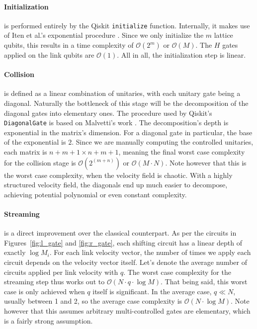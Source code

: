 \paragraph*{Initialization} is performed entirely by the Qiskit \texttt{initialize} function.
Internally, it makes use of Iten et al.'s exponential procedure \cite{iten2016isometries}.
Since we only initialize the $m$ lattice qubits, this results in a time complexity of $\mathcal{O}(2^m)$ or $\mathcal{O}(M)$.
The $H$ gates applied on the link qubits are $\mathcal{O}(1)$.
All in all, the initialization step is linear.

\paragraph*{Collision} is defined as a linear combination of unitaries, with each unitary gate being a diagonal.
Naturally the bottleneck of this stage will be the decomposition of the diagonal gates into elementary ones.
The procedure used by Qiskit's \texttt{DiagonalGate} is based on Malvetti's work \cite{malvetti2018synthesis}. The decomposition's depth is exponential in the matrix's dimension.
For a diagonal gate in particular, the base of the exponential is $2$.
Since we are manually computing the controlled unitaries, each matrix is $n+m+1 \times n+m+1$, meaning the final worst case complexity for the collision stage is $\mathcal{O}(2^{(m+n)})$ or $\mathcal{O}(M\cdot N)$.
Note however that this is the worst case complexity, when the velocity field is chaotic.
With a highly structured velocity field, the diagonals end up much easier to decompose, achieving potential polynomial or even constant complexity.

\paragraph*{Streaming} is a direct improvement over the classical counterpart.
As per the circuits in Figures~\ref{fig:l_gate} and \ref{fig:r_gate}, each shifting circuit has a linear depth of exactly $\log{M_i}$.
For each link velocity vector, the number of times we apply each circuit depends on the velocity vector itself.
Let's denote the average number of circuits applied per link velocity with $q$.
The worst case complexity for the streaming step thus works out to $\mathcal{O}(N\cdot q\cdot\log{M})$.
That being said, this worst case is only achieved when $q$ itself is significant.
In the average case, $q \ll N$, usually between 1 and 2, so the average case complexity is $\mathcal{O}(N\cdot\log{M})$.
Note however that this assumes arbitrary multi-controlled gates are elementary, which is a fairly strong assumption.

